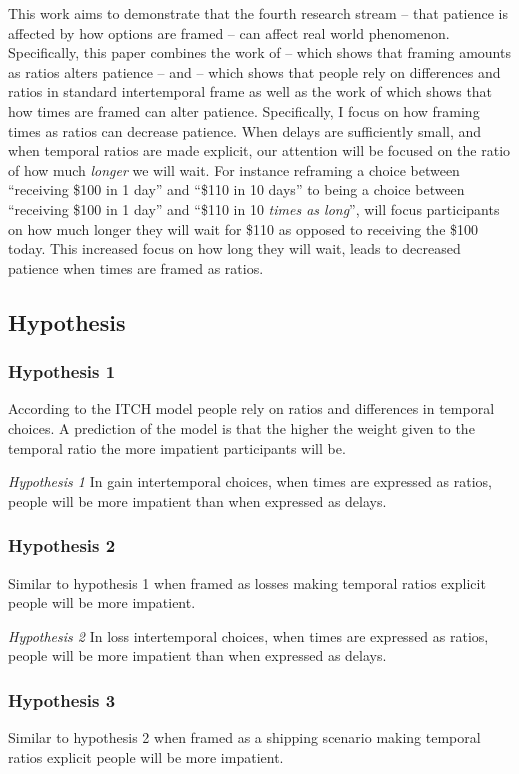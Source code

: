 \documentclass[]{article}
\begin{document}
 
This work aims to demonstrate that the fourth research stream -- that patience is affected by how options are framed -- can affect real world phenomenon.
Specifically, this paper combines the work of  -- which shows that framing amounts as ratios alters patience -- and  -- which shows that people rely on differences and ratios in standard intertemporal frame as well as the work  of   which shows that how times are framed can alter patience. 
Specifically, I focus on how framing times as ratios can decrease patience.
When delays are sufficiently small, and when temporal ratios are made explicit, our attention will be focused on the ratio of how much \textit{longer} we will wait. 
For instance reframing a choice between ``receiving \$100  in 1 day'' and ``\$110 in 10 days'' to being a choice between ``receiving \$100  in 1 day'' and ``\$110 in 10 \textit{times as long}'', will focus participants on how much longer they will wait for \$110 as opposed to receiving the \$100 today.
This increased focus on how long they will wait, leads to decreased patience when times are framed as ratios.

\subsection{Hypothesis}

\subsubsection{Hypothesis 1}
According to the ITCH model people rely on ratios and differences in temporal choices. 
A prediction of the model is that the higher the weight given to the temporal ratio the more impatient participants will be.

\textit{Hypothesis 1} In gain intertemporal choices, when times are expressed as ratios, people will be more impatient than when expressed as delays. 

\subsubsection{Hypothesis 2}
Similar to hypothesis 1 when framed as losses making temporal ratios explicit people will be more impatient. 

\textit{Hypothesis 2} In loss intertemporal choices, when times are expressed as ratios, people will be more impatient than when expressed as delays. 


\subsubsection{Hypothesis 3}
Similar to hypothesis 2 when framed as a shipping scenario making temporal ratios explicit people will be more impatient. 
\end{document}
